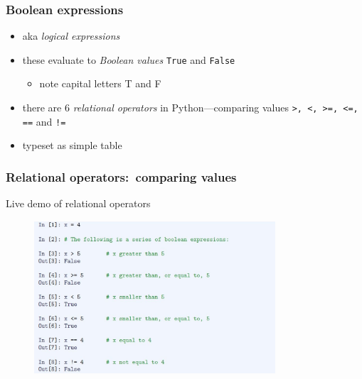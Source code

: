 \documentclass[english,14pt]{beamer}
\newcommand\red[1]{{\color{red} #1}}
\begin{document}

\begin{frame}[fragile]

\frametitle{Boolean expressions}

	
	
\begin{itemize}
	\item aka \red{\emph{logical expressions}}
	\item these evaluate to \red{\emph{Boolean values}} \texttt{True} and \texttt{False}
	\begin{itemize}
		\item note capital letters T and F
	\end{itemize}
	\item  there are 6 \red{\emph{relational operators}} in Python---comparing values
	 \verb+>, <, >=, <=, ==+ and \verb+!=+
	 \item typeset as simple table
	 
\end{itemize}

\end{frame}


\begin{frame}[fragile]

\frametitle{Relational operators:~comparing values}

Live demo of relational operators

\begin{figure}[ht]
	\centering
	\includegraphics[width=0.8\textwidth]{figures/LLp46}
\end{figure}


	
\end{frame}
\end{document}
